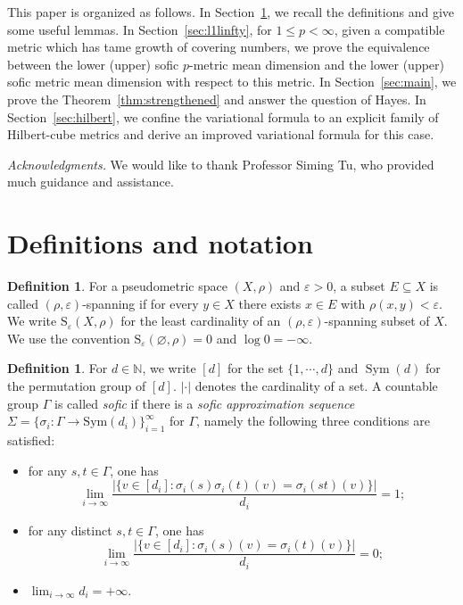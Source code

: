 \documentclass[12pt]{amsart}
\theoremstyle{definition}
\newtheorem{definition}[theorem]{Definition}
\theoremstyle{remark}
\newcommand{\Sym}{\operatorname{Sym}}
\newcommand{\N}{\mathbb N}
\begin{document}
This paper is organized as follows. 
In Section~\ref{sec:prelim}, we recall the definitions and give some useful lemmas. In Section~\ref{sec:l1linfty}, for $1\leq p < \infty$, given  a compatible metric which has tame growth of covering numbers, we prove the equivalence between the lower (upper) sofic $p$-metric mean dimension and the lower (upper) sofic metric mean dimension with respect to this metric. In Section~\ref{sec:main}, we prove the Theorem~\ref{thm:strengthened} and answer the question of Hayes. In Section~\ref{sec:hilbert}, we confine the variational formula to an explicit family of Hilbert-cube metrics and derive an improved variational formula for this case.

\emph{Acknowledgments.} We would like to thank Professor Siming Tu, who provided much guidance and assistance.


 \section{Definitions and notation}\label{sec:prelim}
\begin{definition}
For a pseudometric space $(X,\rho)$ and $\varepsilon>0$, a subset $E\subseteq X$ is called $(\rho,\varepsilon)$-spanning if for every $y\in X$ there exists $x\in E$ with $\rho(x,y)<\varepsilon$. We write
$\mathrm{S}_\varepsilon(X,\rho)$
for the least cardinality of an $(\rho,\varepsilon)$-spanning subset of $X$. We use the convention $\mathrm{S}_\varepsilon(\varnothing,\rho)=0$ and $\log 0=-\infty$.
\end{definition}

\begin{definition}
For $d \in \N$, we write $[d]$ for the set $\{1,\cdots,d\}$ and  \(\Sym(d)\) for the permutation group of $[d]$. $|\cdot|$ denotes the cardinality of a set. A countable group $\Gamma$ is called \emph{sofic} if there is a \emph{sofic approximation sequence} $\Sigma=\{\sigma_{i}:\Gamma\rightarrow \text{Sym}(d_{i})\}_{i=1}^{\infty}$ for $\Gamma$, namely the following three conditions are satisfied:
		\begin{itemize}
			\item [(1)]for any $s,t \in \Gamma$, one has 
			$$\lim_{i \rightarrow \infty}\frac{|\{v \in [d_{i}]:\sigma_{i}(s)\sigma_{i}(t)(v)=\sigma_{i}(st)(v)\}|}{d_{i}}=1;$$
			\item [(2)]for any distinct $s,t \in \Gamma$, one has $$\lim_{i \rightarrow \infty}\frac{|\{v \in [d_{i}]:\sigma_{i}(s)(v)=\sigma_{i}(t)(v)\}|}{d_{i}}=0;$$
			\item [(3)] $\lim_{i \rightarrow \infty}d_{i}=+\infty.$
		\end{itemize}    
\end{definition}
\end{document}
